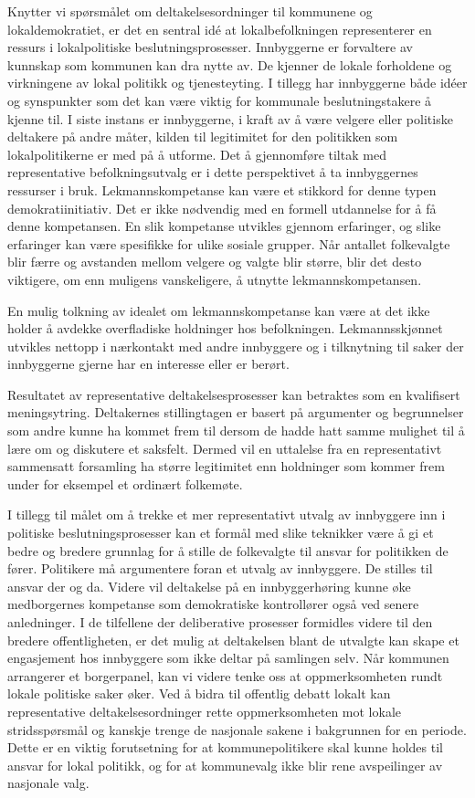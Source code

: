\documentclass[
  12pt,
  a4paper, 12pt]{article}
\begin{document}
Knytter vi spørsmålet om deltakelsesordninger til kommunene og lokaldemokratiet, er det en sentral idé at lokalbefolkningen representerer en ressurs i lokalpolitiske beslutningsprosesser. Innbyggerne er forvaltere av kunnskap som kommunen kan dra nytte av. De kjenner de lokale forholdene og virkningene av lokal politikk og tjenesteyting. I tillegg har innbyggerne både idéer og synspunkter som det kan være viktig for kommunale beslutningstakere å kjenne til. I siste instans er innbyggerne, i kraft av å være velgere eller politiske deltakere på andre måter, kilden til legitimitet for den politikken som lokalpolitikerne er med på å utforme. Det å gjennomføre tiltak med representative befolkningsutvalg er i dette perspektivet å ta innbyggernes ressurser i bruk. Lekmannskompetanse kan være et stikkord for denne typen demokratiinitiativ. Det er ikke nødvendig med en formell utdannelse for å få denne kompetansen. En slik kompetanse utvikles gjennom erfaringer, og slike erfaringer kan være spesifikke for ulike sosiale grupper. Når antallet folkevalgte blir færre og avstanden mellom velgere og valgte blir større, blir det desto viktigere, om enn muligens vanskeligere, å utnytte lekmannskompetansen.

En mulig tolkning av idealet om lekmannskompetanse kan være at det ikke holder å avdekke overfladiske holdninger hos befolkningen. Lekmannsskjønnet utvikles nettopp i nærkontakt med andre innbyggere og i tilknytning til saker der innbyggerne gjerne har en interesse eller er berørt.

Resultatet av representative deltakelsesprosesser kan betraktes som en kvalifisert meningsytring. Deltakernes stillingtagen er basert på argumenter og begrunnelser som andre kunne ha kommet frem til dersom de hadde hatt samme mulighet til å lære om og diskutere et saksfelt. Dermed vil en uttalelse fra en representativt sammensatt forsamling ha større legitimitet enn holdninger som kommer frem under for eksempel et ordinært folkemøte.

I tillegg til målet om å trekke et mer representativt utvalg av innbyggere inn i politiske beslutningsprosesser kan et formål med slike teknikker være å gi et bedre og bredere grunnlag for å stille de folkevalgte til ansvar for politikken de fører. Politikere må argumentere foran et utvalg av innbyggere. De stilles til ansvar der og da. Videre vil deltakelse på en innbyggerhøring kunne øke medborgernes kompetanse som demokratiske kontrollører også ved senere anledninger. I de tilfellene der deliberative prosesser formidles videre til den bredere offentligheten, er det mulig at deltakelsen blant de utvalgte kan skape et engasjement hos innbyggere som ikke deltar på samlingen selv. Når kommunen arrangerer et borgerpanel, kan vi videre tenke oss at oppmerksomheten rundt lokale politiske saker øker. Ved å bidra til offentlig debatt lokalt kan representative deltakelsesordninger rette oppmerksomheten mot lokale stridsspørsmål og kanskje trenge de nasjonale sakene i bakgrunnen for en periode. Dette er en viktig forutsetning for at kommunepolitikere skal kunne holdes til ansvar for lokal politikk, og for at kommunevalg ikke blir rene avspeilinger av nasjonale valg.
\end{document}
